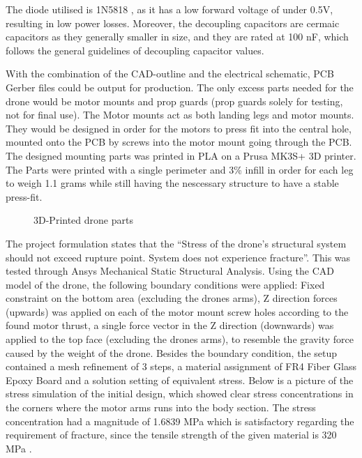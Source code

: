 The diode utilised is 1N5818 \cite{1N5818}, as it has a low 
forward voltage of under 0.5V, resulting in low 
power losses. Moreover, the decoupling capacitors
are cermaic capacitors as they generally smaller
in size, and they are rated at 100 nF, which follows 
the general guidelines of decoupling capacitor values.
\cite{DecouplingCap}

With the combination of the CAD-outline and the electrical schematic, PCB Gerber files could be output for production. The only excess parts needed for the drone would be motor mounts and prop guards (prop guards solely for testing, not for final use). The Motor mounts act as both landing legs and motor mounts. They would be designed in order for the motors to press fit into the central hole, mounted onto the PCB by screws into the motor mount going through the PCB. The designed mounting parts was printed in PLA on a Prusa MK3S+ 3D printer. The Parts were printed with a single perimeter and 3\% infill in order for each leg to weigh 1.1 grams while still having the nescessary structure to have a stable press-fit. 

\begin{figure}[H]%
    \centering
    \qquad
    \qquad
    \caption{3D-Printed drone parts}%
    \label{fig:example}%
\end{figure}

The project formulation states that the “Stress of the drone’s structural system should not exceed rupture point. System does not experience fracture”. This was tested through Ansys Mechanical Static Structural Analysis. Using the CAD model of the drone, the following boundary conditions were applied: Fixed constraint on the bottom area (excluding the drones arms), Z direction forces (upwards) was applied on each of the motor mount screw holes according to the found motor thrust, a single force vector in the Z direction (downwards) was applied to the top face (excluding the drones arms), to resemble the gravity force caused by the weight of the drone. Besides the boundary condition, the setup contained a mesh refinement of 3 steps, a material assignment of FR4 Fiber Glass Epoxy Board and a solution setting of equivalent stress. Below is a picture of the stress simulation of the initial design, which showed clear stress concentrations in the corners where the motor arms runs into the body section. The stress concentration had a magnitude of 1.6839 MPa which is satisfactory regarding the requirement of fracture, since the tensile strength of the given material is 320 MPa \cite{FR4}. 

